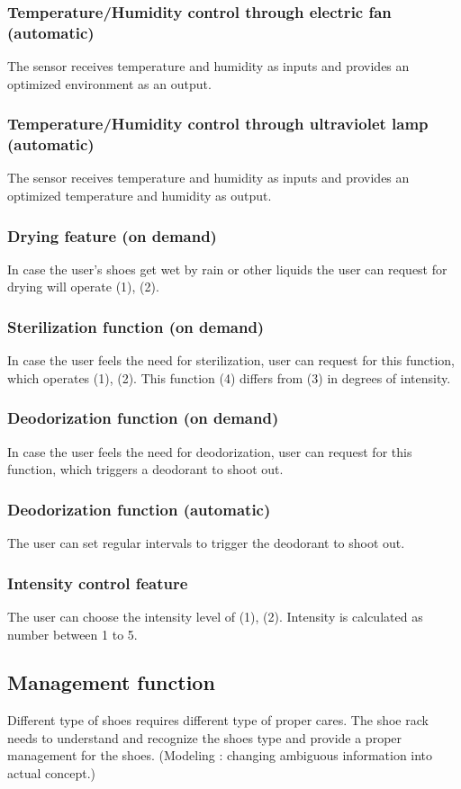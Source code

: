 \documentclass[conference]{IEEEtran}
\begin{document}
\subsubsection{Temperature/Humidity control through electric fan (automatic)}
The sensor receives temperature and humidity as inputs and provides an optimized environment as an output.
\subsubsection{Temperature/Humidity control through ultraviolet lamp (automatic)}
The sensor receives temperature and humidity as inputs and provides an optimized temperature and humidity as output.
\subsubsection{Drying feature (on demand)}
In case the user's shoes get wet by rain or other liquids the user can request for drying will operate (1), (2).
\subsubsection{Sterilization function (on demand)}
In case the user feels the need for sterilization, user can request for this function, which operates (1), (2).
This function (4) differs from (3) in degrees of intensity.
\subsubsection{Deodorization function (on demand)}
In case the user feels the need for deodorization, user can request for this function, which triggers a deodorant to shoot out.
\subsubsection{Deodorization function (automatic)}
The user can set regular intervals to trigger the deodorant to shoot out.
\subsubsection{Intensity control feature}
The user can choose the intensity level of (1), (2). Intensity is calculated as number between 1 to 5.\\


\subsection{Management function}
Different type of shoes requires different type of proper cares. The shoe rack needs to understand and recognize the shoes type and provide a proper management for the shoes.
(Modeling : changing ambiguous information into actual concept.)
\end{document}
